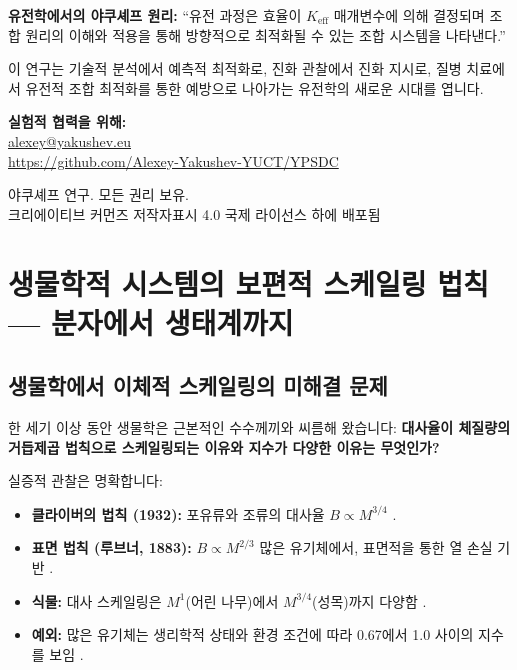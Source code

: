 \documentclass[11pt,a4paper]{article}
\begin{document}
	\textbf{유전학에서의 야쿠셰프 원리:}
	``유전 과정은 효율이 \(K_{\text{eff}}\) 매개변수에 의해 결정되며 조합 원리의 이해와 적용을 통해 방향적으로 최적화될 수 있는 조합 시스템을 나타낸다.''
	
	이 연구는 기술적 분석에서 예측적 최적화로, 진화 관찰에서 진화 지시로, 질병 치료에서 유전적 조합 최적화를 통한 예방으로 나아가는 유전학의 새로운 시대를 엽니다.
	
	\begin{center}
		\vspace{1cm}
		\textbf{실험적 협력을 위해:}\\
		\url{alexey@yakushev.eu}\\
		\url{https://github.com/Alexey-Yakushev-YUCT/YPSDC}
		
		\vspace{0.5cm}
		 야쿠셰프 연구. 모든 권리 보유.\\
		크리에이티브 커먼즈 저작자표시 4.0 국제 라이선스 하에 배포됨
	\end{center}
	
	\section{생물학적 시스템의 보편적 스케일링 법칙 — 분자에서 생태계까지}
	\label{sec:bio-scaling}
	
	\subsection{생물학에서 이체적 스케일링의 미해결 문제}
	
	한 세기 이상 동안 생물학은 근본적인 수수께끼와 씨름해 왔습니다: \textbf{대사율이 체질량의 거듭제곱 법칙으로 스케일링되는 이유와 지수가 다양한 이유는 무엇인가?}
	
	실증적 관찰은 명확합니다:
	\begin{itemize}
		\item \textbf{클라이버의 법칙 (1932):} 포유류와 조류의 대사율 \(B \propto M^{3/4}\) \cite{Kleiber1932,West1997}.
		\item \textbf{표면 법칙 (루브너, 1883):} \(B \propto M^{2/3}\) 많은 유기체에서, 표면적을 통한 열 손실 기반 \cite{Rubner1883}.
		\item \textbf{식물:} 대사 스케일링은 \(M^{1}\)(어린 나무)에서 \(M^{3/4}\)(성목)까지 다양함 \cite{Reich2006}.
		\item \textbf{예외:} 많은 유기체는 생리학적 상태와 환경 조건에 따라 0.67에서 1.0 사이의 지수를 보임 \cite{Glazier2005}.
	\end{itemize}
	
\end{document}
